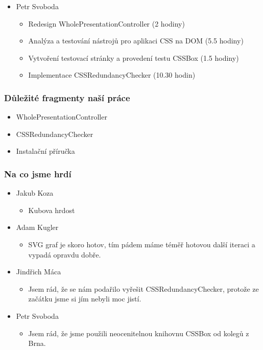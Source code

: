 \documentclass{beamer}
\begin{document}
\begin{frame}[allowframebreaks]
\begin{itemize}
    \item Petr Svoboda
      \begin{itemize}
       \item Redesign WholePresentationController (2 hodiny)
       \item Analýza a testování nástrojů pro aplikaci CSS na DOM (5.5 hodiny)
			 \item Vytvoření testovací stránky a provedení testu CSSBox (1.5 hodiny)
       \item Implementace CSSRedundancyChecker (10.30 hodin)
     \end{itemize}
   \end{itemize}  
\end{frame} 

\begin{frame}[allowframebreaks]\frametitle{Důležité fragmenty naší práce}
  \begin{itemize}
    \item WholePresentationController
		\item CSSRedundancyChecker
		\item Instalační příručka
  \end{itemize}
\end{frame}

\begin{frame}[allowframebreaks]\frametitle{Na co jsme hrdí} 
  \begin{itemize}
    \item Jakub Koza
      \begin{itemize}
       \item Kubova hrdost
     \end{itemize}
   
    \item Adam Kugler
      \begin{itemize}
       \item SVG graf je skoro hotov, tím pádem máme téměř hotovou další iteraci a vypadá opravdu dobře.
     \end{itemize}

    \item Jindřich Máca
      \begin{itemize}
       \item Jsem rád, že se nám podařilo vyřešit CSSRedundancyChecker, protože ze začátku jsme si jím nebyli moc jistí.
      \end{itemize}  
   
    \item Petr Svoboda
      \begin{itemize}
       \item Jsem rád, že jsme použili neocenitelnou knihovnu CSSBox od kolegů z Brna.
     \end{itemize}
   \end{itemize}  
\end{frame}
\end{document}
